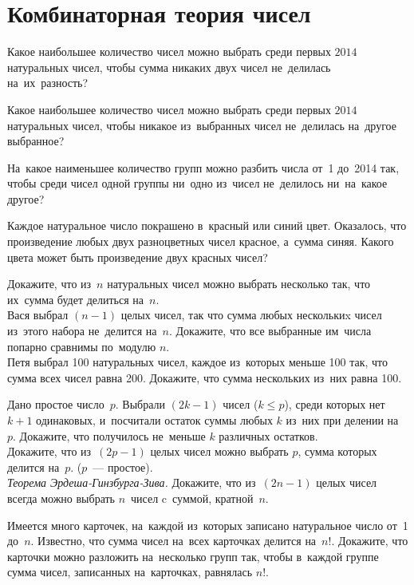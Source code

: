 
\section*{Комбинаторная теория чисел}


\begin{problems}

\item
Какое наибольшее количество чисел можно выбрать среди первых $2014$ натуральных
чисел, чтобы сумма никаких двух чисел не~делилась на~их~разность?

\item
Какое наибольшее количество чисел можно выбрать среди первых $2014$ натуральных
чисел, чтобы никакое из~выбранных чисел не~делилась на~другое выбранное?

\item
На~какое наименьшее количество групп можно разбить числа от~1 до~2014 так,
чтобы среди чисел одной группы ни~одно из~чисел не~делилось ни~на~какое другое?

\item
Каждое натуральное число покрашено в~красный или синий цвет.
Оказалось, что произведение любых двух разноцветных чисел красное, а~сумма
синяя.
Какого цвета может быть произведение двух красных чисел?

\item
\sp
Докажите, что из~$n$ натуральных чисел можно выбрать несколько так, что
их~сумма будет делиться на~$n$.
\\
\sp
Вася выбрал $(n - 1)$ целых чисел, так что сумма любых несколькиx чисел
из~этого набора не~делится на~$n$.
Докажите, что все выбранные им~числа попарно сравнимы по~модулю $n$.
\\
\sp
Петя выбрал 100 натуральных чисел, каждое из~которых меньше 100 так, что сумма
всех чисел равна 200.
Докажите, что сумма нескольких из~них равна 100.

\item
\sp
Дано простое число~$p$.
Выбрали $(2 k - 1)$ чисел ($k \leq p$), среди которых нет $k + 1$ одинаковых,
и~посчитали остаток суммы любых $k$ из~них при делении на~$p$.
Докажите, что получилось не~меньше $k$ различных остатков.
\\
\sp
Докажите, что из~$(2 p - 1)$ целых чисел можно выбрать $p$, сумма которых
делится на~$p$.
($p$~--- простое).
\\
\sp\emph{Теорема Эрдеша-Гинзбурга-Зива.}
Докажите, что из~$(2 n - 1)$ целых чисел всегда можно выбрать $n$~чисел
c~суммой, кратной~$n$.

\item
Имеется много карточек, на~каждой из~которых записано натуральное число
от~1 до~$n$.
Известно, что сумма чисел на~всех карточках делится на~$n!$.
Докажите, что карточки можно разложить на~несколько групп так, чтобы в~каждой
группе сумма чисел, записанных на~карточках, равнялась $n!$.

\end{problems}

